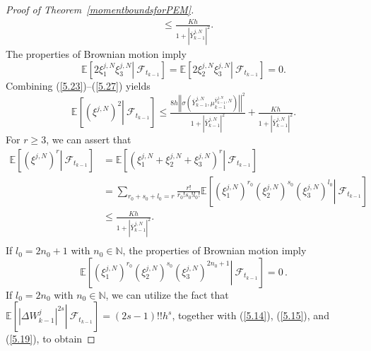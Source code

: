 \documentclass[12pt]{article}
\numberwithin{equation}{section}
\begin{document}
\begin{proof}[Proof of Theorem~\ref{momentboundsforPEM}]
\begin{equation}
\begin{aligned}
& \leq \tfrac{K h}{1+\left|\bar{Y}^{j,N}_{k-1}\right|^2}.
\end{aligned}
\end{equation}
The properties of Brownian motion imply
\begin{equation}\tag{5.74}\label{5.27}
\mathbb{E}\left[\left.2 \xi^{j,N}_1 \xi^{j,N}_3  \right\rvert\ \mathcal{F}_{t_{k-1}}\right]=\mathbb{E}\left[\left.2 \xi^{j,N}_2 \xi^{j,N}_3  \right\rvert\ \mathcal{F}_{t_{k-1}}\right]=0.
\end{equation}
Combining (\ref{5.23})--(\ref{5.27}) yields
\begin{equation}\tag{5.75}\label{5.28}
\mathbb{E}\left[\left.\left(\xi^{j,N}\right)^2  \right\rvert\ \mathcal{F}_{t_{k-1}}\right] \leq \tfrac{8 h \left|\left|\sigma\left(\bar{Y}^{j,N}_{k-1},\mu^{\bar{Y}^{j,N}_{k-1},N}_{k-1}\right)\right|\right|^2}{1+\left|\bar{Y}^{j,N}_{k-1}\right|^2}+\tfrac{K h}{1+\left|\bar{Y}^{j,N}_{k-1}\right|^2}.
\end{equation}  
For $r \geq 3$, we can assert that
\begin{equation}\tag{5.76}\label{5.29}
\begin{aligned}
\mathbb{E} \left[\left. \left(\xi ^{j,N}\right)^r \right\rvert\ \mathcal{F} _{t_{k-1}} \right] &=\mathbb{E} \left[\left. \left( \xi _{1}^{j,N}+\xi _{2}^{j,N}+\xi _{3}^{j,N} \right) ^r\right\rvert\ \mathcal{F} _{t_{k-1}} \right] 
\\
&=\sum_{r_0+s_0+l_0=r}{\tfrac{r!}{r_0!s_0!l_0!}}\mathbb{E} \left[\left.\left( \xi _{1}^{j,N} \right) ^{r_0}\left( \xi _{2}^{j,N} \right) ^{s_0}\left( \xi _{3}^{j,N} \right) ^{l_0} \right\rvert\ \mathcal{F} _{t_{k-1}} \right] 
\\
&\le \tfrac{Kh}{1+\left|\bar{Y}_{k-1}^{j,N}\right|^2}.\\
\end{aligned}
\end{equation}
If $ l_0 = 2n_0 + 1 $ with $ n_0 \in \mathbb{N} $, the properties of Brownian motion imply 
\begin{equation}\tag{5.77}\label{5.30}
\mathbb{E} \left[\left. \left( \xi _{1}^{j,N} \right) ^{r_0}\left( \xi _{2}^{j,N} \right) ^{s_0}\left( \xi _{3}^{j,N} \right) ^{2n_0+1}\right\rvert\ \mathcal{F} _{t_{k-1}} \right] =0\,. 
\end{equation}
If $l_0=2n_0$ with $n_0 \in \mathbb{N}$, we can utilize the fact that $\mathbb{E} \left[\left. \left| \Delta W_{k-1}^{j} \right|^{2s}\right\rvert\ \mathcal{F} _{t_{k-1}} \right] =\left( 2s-1 \right) !!h^s$, together with (\ref{5.14}), (\ref{5.15}), and (\ref{5.19}), to obtain

\end{proof}
\end{document}
